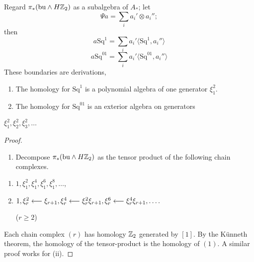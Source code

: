 \documentclass[../main]{subfiles}
\begin{document}
Regard $\pi_\ast(\mathrm{bu}\wedge H\mathbb{Z}_2)$ as a subalgebra of $A_\ast$; let \begin{equation*}
    \Psi a = \sum_{i}a_{i}'\otimes a_{i}'';
\end{equation*}
then \begin{equation*}
    a\mathrm{Sq}^{1}=\sum_{i}a_{i}'\langle\mathrm{Sq}^{1}, a_{i}''\rangle 
\end{equation*}
\begin{equation*}
    a\mathrm{Sq}^{01}=\sum_{i}a_{i}'\langle\mathrm{Sq}^{01}, a_{i}''\rangle 
\end{equation*}
These boundaries are derivations, 
\begin{lemma}\begin{enumerate}[label=(\roman*)] \label{lem:p3ch16.9}
    \item The homology for $\mathrm{Sq}^{1}$ is a polynomial algebra of one generator $\xi_{1}^{2}$.\\
    \item The homology for $\mathrm{Sq}^{01}$ is an exterior algebra on generators
\end{enumerate} 
 $\xi_{1}^{2}, \xi_{2}^{2}, \xi_{3}^{2}, \dots$
 
\end{lemma}
\begin{proof}
\begin{enumerate}[label=(\roman*)]
    \item[(i)] Decompose $\pi_{\ast}(\mathrm{bu} \wedge H\mathbb{Z}_2)$ as the tensor product of the following chain complexes.
 \end{enumerate}  
    \begin{enumerate}
        \item[(1)] $1, \xi_{1}^{2}, \xi_{1}^{4}, \xi_{1}^{6}, \xi_{1}^{8}, \dots$, 
        
        \item[($r$)] $1, \xi_{r}^{2}\overset{}{\longleftarrow} \xi_{r+1}, \xi_{r}^{4}\overset{}{\longleftarrow} \xi_{r}^{2}\xi_{r+1}, \xi_{r}^{6}\overset{}{\longleftarrow} \xi_{r}^{4}\xi_{r+1}, \dots.$ 
        
        ($r \ge 2$)
    \end{enumerate}
    
    Each chain complex $(r)$ has homology $\mathbb{Z}_2$ generated by $[1]$. By the Künneth theorem, the homology of the tensor-product is the homology of $(1)$. A similar proof works for (ii).
    \end{proof}
\end{document}
